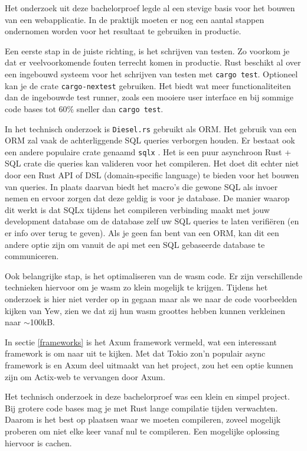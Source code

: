 Het onderzoek uit deze bachelorproef legde al een stevige basis voor het bouwen van een
webapplicatie. In de praktijk moeten er nog een aantal stappen ondernomen worden voor het resultaat
te gebruiken in productie.

Een eerste stap in de juiste richting, is het schrijven van testen. Zo voorkom je dat er
veelvoorkomende fouten terrecht komen in productie. Rust beschikt al over een ingebouwd systeem voor
het schrijven van testen met \texttt{cargo test}. Optioneel kan je de crate
\texttt{cargo-nextest} gebruiken. Het biedt wat meer functionaliteiten dan de ingebouwde
test runner, zoals een mooiere user interface en bij sommige code bases tot 60\% sneller dan
\texttt{cargo test}.

In het technisch onderzoek is \texttt{Diesel.rs} gebruikt als ORM. Het gebruik van een ORM
zal vaak de achterliggende SQL queries verborgen houden. Er bestaat ook een andere populaire crate
genaamd \texttt{sqlx} \cite{sqlx}. Het is een puur asynchroon Rust + SQL crate die queries
kan valideren voor het compileren. Het doet dit echter niet door een Rust API of DSL
(domain-specific language) te bieden voor het bouwen van queries. In plaats daarvan biedt het
macro's die gewone SQL als invoer nemen en ervoor zorgen dat deze geldig is voor je database. De
manier waarop dit werkt is dat SQLx tijdens het compileren verbinding maakt met jouw development
database om de database zelf uw SQL queries te laten verifiëren (en er info over terug te geven).
Als je geen fan bent van een ORM, kan dit een andere optie zijn om vanuit de api met een SQL
gebaseerde database te communiceren.

Ook belangrijke stap, is het optimaliseren van de wasm code. Er zijn verschillende technieken
hiervoor om je wasm zo klein mogelijk te krijgen. Tijdens het onderzoek is hier niet verder op in
gegaan maar als we naar de code voorbeelden kijken van Yew, zien we dat zij hun wasm groottes hebben
kunnen verkleinen naar $\sim$100kB. \cite{wasm_size}

In sectie \ref{frameworks} is het Axum framework vermeld, wat een interessant framework is om naar
uit te kijken. Met dat Tokio zon'n populair async framework is en Axum deel uitmaakt van het
project, zou het een optie kunnen zijn om Actix-web te vervangen door Axum. 

\clearpage

Het technisch onderzoek in deze bachelorproef was een klein en simpel project. Bij grotere code
bases mag je met Rust lange compilatie tijden verwachten. Daarom is het best op plaatsen waar we
moeten compileren, zoveel mogelijk proberen om niet elke keer vanaf nul te compileren. Een mogelijke
oplossing hiervoor is cachen.


